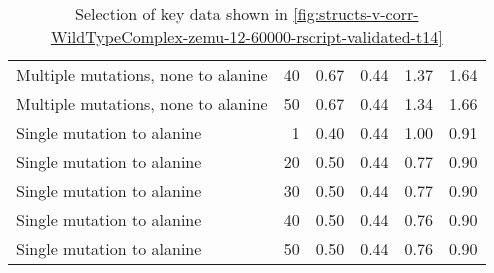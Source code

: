 \begin{table}
\begin{tabular}{lrrrrr}
 Multiple mutations, none to alanine &          40 &          0.67 &                    0.44 &            1.37 &                      1.64 \\
 Multiple mutations, none to alanine &          50 &          0.67 &                    0.44 &            1.34 &                      1.66 \\
          Single mutation to alanine &           1 &          0.40 &                    0.44 &            1.00 &                      0.91 \\
          Single mutation to alanine &          20 &          0.50 &                    0.44 &            0.77 &                      0.90 \\
          Single mutation to alanine &          30 &          0.50 &                    0.44 &            0.77 &                      0.90 \\
          Single mutation to alanine &          40 &          0.50 &                    0.44 &            0.76 &                      0.90 \\
          Single mutation to alanine &          50 &          0.50 &                    0.44 &            0.76 &                      0.90 \\
\bottomrule
\end{tabular}

\caption[]{Selection of key data shown in \cref{fig:structs-v-corr-WildTypeComplex-zemu-12-60000-rscript-validated-t14}}
\label{tab:structs-v-corr-WildTypeComplex-zemu-12-60000-rscript-validated-t14-underlying-data}
\end{table}
